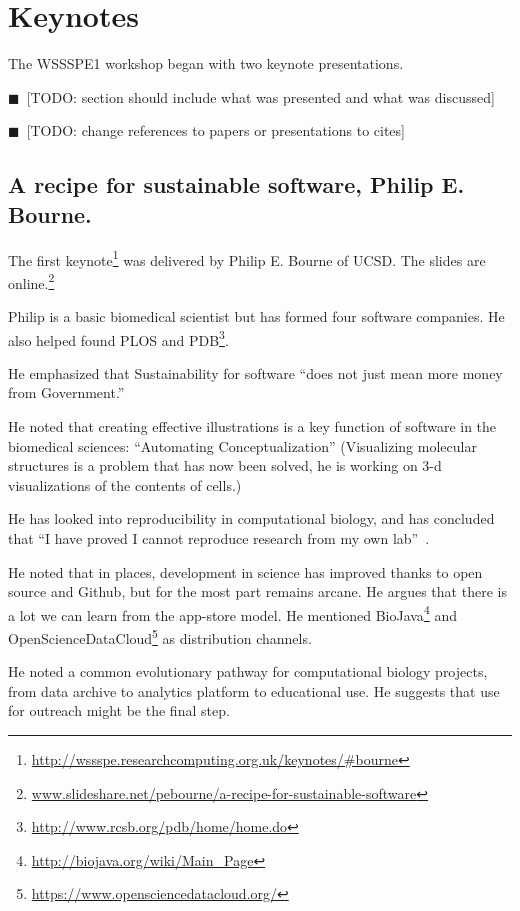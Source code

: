 \documentclass[11pt, oneside]{amsart}
\newcommand{\todo}[1]{{\color{blue}$\blacksquare$~\textsf{[TODO: #1]}}}
\begin{document}
\section{Keynotes} \label{sec:keynotes}

The WSSSPE1 workshop began with two keynote presentations.

\todo{section should include what was presented and what was discussed}

\todo{change references to papers or presentations to cites}

\subsection{A recipe for sustainable software, Philip E. Bourne.}

The first keynote\footnote{\url{http://wssspe.researchcomputing.org.uk/keynotes/\#bourne}}
was delivered by Philip E. Bourne of UCSD. The slides
are online.\footnote{\url{www.slideshare.net/pebourne/a-recipe-for-sustainable-software}}

Philip is a basic biomedical scientist but has formed four software
companies. He also helped found PLOS and PDB\footnote{\url{http://www.rcsb.org/pdb/home/home.do}}.

He emphasized that Sustainability for software ``does not just mean more
money from Government.''

He noted that creating effective illustrations is a key function of
software in the biomedical sciences: ``Automating Conceptualization''
(Visualizing molecular structures is a problem that has now been solved,
he is working on 3-d visualizations of the contents of cells.)

He has looked into reproducibility in computational biology, and has
concluded that ``I have proved I cannot reproduce research from my own
lab''~\cite{Veretnik}.

He noted that in places, development in science has improved thanks to
open source and Github, but for the most part remains arcane. He argues
that there is a lot we can learn from the app-store model. He
mentioned BioJava\footnote{\url{http://biojava.org/wiki/Main_Page}} and
OpenScienceDataCloud\footnote{\url{https://www.opensciencedatacloud.org/}} as
distribution channels.

He noted a common evolutionary pathway for computational biology
projects, from data archive to analytics platform to educational use. He
suggests that use for outreach might be the final step.
\end{document}
